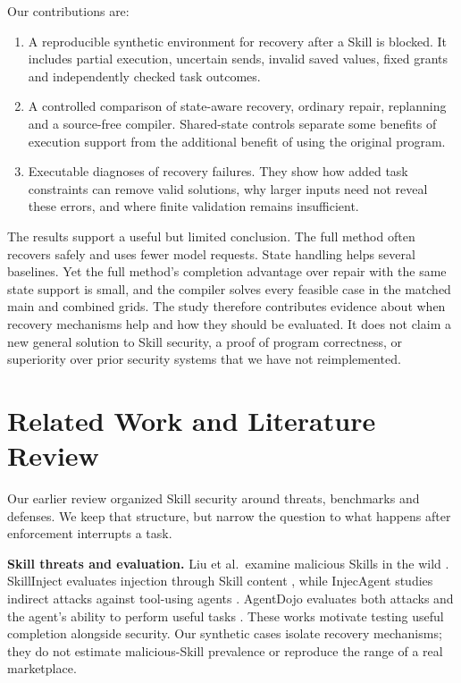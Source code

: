\documentclass[conference]{IEEEtran}
\begin{document}
Our contributions are:
\begin{enumerate}
\item A reproducible synthetic environment for recovery after a Skill is blocked. It includes partial execution, uncertain sends, invalid saved values, fixed grants and independently checked task outcomes.
\item A controlled comparison of state-aware recovery, ordinary repair, replanning and a source-free compiler. Shared-state controls separate some benefits of execution support from the additional benefit of using the original program.
\item Executable diagnoses of recovery failures. They show how added task constraints can remove valid solutions, why larger inputs need not reveal these errors, and where finite validation remains insufficient.
\end{enumerate}

The results support a useful but limited conclusion. The full method often recovers safely and uses fewer model requests. State handling helps several baselines. Yet the full method's completion advantage over repair with the same state support is small, and the compiler solves every feasible case in the matched main and combined grids. The study therefore contributes evidence about when recovery mechanisms help and how they should be evaluated. It does not claim a new general solution to Skill security, a proof of program correctness, or superiority over prior security systems that we have not reimplemented.

\section{Related Work and Literature Review}
Our earlier review organized Skill security around threats, benchmarks and defenses. We keep that structure, but narrow the question to what happens after enforcement interrupts a task.

\textbf{Skill threats and evaluation.}
Liu et al.\ examine malicious Skills in the wild \cite{liu}. SkillInject evaluates injection through Skill content \cite{skillinject}, while InjecAgent studies indirect attacks against tool-using agents \cite{injecagent}. AgentDojo evaluates both attacks and the agent's ability to perform useful tasks \cite{agentdojo}. These works motivate testing useful completion alongside security. Our synthetic cases isolate recovery mechanisms; they do not estimate malicious-Skill prevalence or reproduce the range of a real marketplace.
\end{document}
